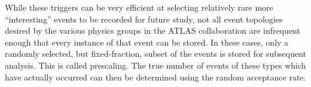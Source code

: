 While these triggers can be very efficient at selecting relatively rare more ``interesting'' events to be recorded for future study, not all event topologies desired by the various physics groups in the ATLAS collaboration are infrequent enough that every instance of that event can be stored.  
In these cases, only a randomly selected, but fixed-fraction, subset of the events is stored for subsequent analysis.  
This is called prescaling.  
The true number of events of these types which have actually occurred can then be determined using the random acceptance rate.  
 
 
 






